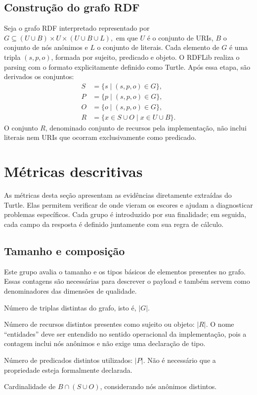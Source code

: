 \documentclass[12pt,a4paper]{article}
\newcommand{\metrica}[1]{\texttt{#1}}
\newcommand{\card}[1]{\left\lvert #1\right\rvert}
\begin{document}
\subsection{Construção do grafo RDF}
Seja o grafo RDF interpretado representado por \( G \subseteq (U \cup B) \times U \times (U \cup B \cup L), \) em que \(U\) é o conjunto de URIs, \(B\) o conjunto de nós anônimos e \(L\) o conjunto de literais. Cada elemento de \(G\) é uma tripla \((s,p,o)\), formada por sujeito, predicado e objeto. O RDFLib realiza o parsing com o formato explicitamente definido como Turtle. Após essa etapa, são derivados os conjuntos:
\begin{align*}
S &= \{s \mid (s,p,o) \in G\},\\
P &= \{p \mid (s,p,o) \in G\},\\
O &= \{o \mid (s,p,o) \in G\},\\
R &= \{x \in S \cup O \mid x \in U \cup B\}.
\end{align*}
O conjunto \(R\), denominado conjunto de recursos pela implementação, não inclui literais nem URIs que ocorram exclusivamente como predicado.
\section{Métricas descritivas}
As métricas desta seção apresentam as evidências diretamente extraídas do Turtle. Elas permitem verificar de onde vieram os escores e ajudam a diagnosticar problemas específicos. Cada grupo é introduzido por sua finalidade; em seguida, cada campo da resposta é definido juntamente com sua regra de cálculo.
\subsection{Tamanho e composição}
Este grupo avalia o tamanho e os tipos básicos de elementos presentes no grafo. Essas contagens são necessárias para descrever o payload e também servem como denominadores das dimensões de qualidade.
\begin{description}[style=nextline]
  \item[\metrica{number\_of\_triples}]
Número de triplas distintas do grafo, isto é, \(\card{G}\).
  \item[\metrica{number\_of\_entities}]
Número de recursos distintos presentes como sujeito ou objeto: \(\card{R}\). O nome ``entidades'' deve ser entendido no sentido operacional da implementação, pois a contagem inclui nós anônimos e não exige uma declaração de tipo.
  \item[\metrica{number\_of\_properties}]
Número de predicados distintos utilizados: \(\card{P}\). Não é necessário que a propriedade esteja formalmente declarada.
  \item[\metrica{number\_of\_blank\_nodes}]
Cardinalidade de \(B \cap (S \cup O)\), considerando nós anônimos distintos.
\end{description}
\end{document}
